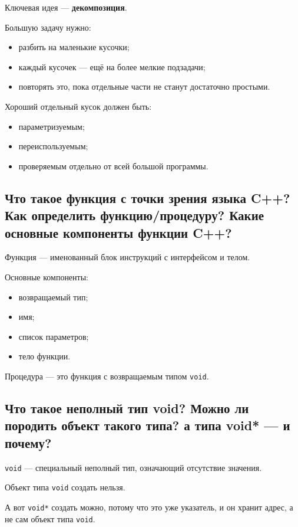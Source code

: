 Ключевая идея --- \textbf{декомпозиция}.

Большую задачу нужно:
\begin{itemize}
    \item разбить на маленькие кусочки;
    \item каждый кусочек --- ещё на более мелкие подзадачи;
    \item повторять это, пока отдельные части не станут достаточно простыми.
\end{itemize}

Хороший отдельный кусок должен быть:
\begin{itemize}
    \item параметризуемым;
    \item переиспользуемым;
    \item проверяемым отдельно от всей большой программы.
\end{itemize}


\subsection{Что такое функция с точки зрения языка C++? Как определить функцию/процедуру? Какие основные компоненты функции C++?}

Функция --- именованный блок инструкций с интерфейсом и телом.

Основные компоненты:
\begin{itemize}
    \item возвращаемый тип;
    \item имя;
    \item список параметров;
    \item тело функции.
\end{itemize}

Процедура --- это функция с возвращаемым типом \texttt{void}.


\subsection{Что такое неполный тип void? Можно ли породить объект такого типа? а типа void* --- и почему?}

\texttt{void} --- специальный неполный тип, означающий отсутствие значения.

Объект типа \texttt{void} создать нельзя.

А вот \texttt{void*} создать можно, потому что это уже указатель, и он хранит адрес, а не сам объект типа \texttt{void}.


